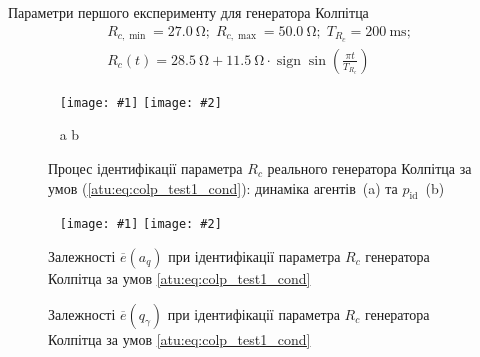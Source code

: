 \documentclass[14pt,handout,utf8]{beamer}
\DeclareMathOperator*{\sign}{sign}
\newlength\DDP
\newcommand{\ABlbl}{%
  \vspace{-2.7ex}
  \begin{center}
    ~ \hfill a \hfill\hfill b \hfill ~
  \end{center}
  \vspace{-2.0ex}
}
\newcommand{\PicDouble}[2]{%
 \begin{center}
    ~ \hfill
    \texttt{[image: \#1]}
    \hfill
    \texttt{[image: \#2]}
    \hfill ~
  \end{center}
  \ABlbl
}
\newcommand{\PicDoubleNL}[2]{%
 \begin{center}
    ~ \hfill
    \texttt{[image: \#1]}
    \hfill
    \texttt{[image: \#2]}
    \hfill ~
  \end{center}
}
\begin{document}
\begin{frame}
  \frametitle{~}

  Параметри першого експерименту для генератора Колпітца
  \begin{equation}
    \begin{array}{c}
      R_{c,\min} = \SI{27.0}{\ohm};
      \;
      R_{c,\max} = \SI{50.0}{\ohm};
      \;
      T_{R_c} = \SI{200}{\milli\second};
      \\
      R_c(t) = \SI{28.5}{\ohm} + \SI{11.5}{\ohm} \cdot \sign \sin \left(  \frac{\pi t}{T_{R_c}}  \right)
    \end{array}
    \label{atu:eq:colp_test1_cond}
  \end{equation}

  \begin{figure}[htb!]
    \PicDouble{../p6/p/r/colp_real_id-p_t_pi_ql3rlWvnAAW_real_d_0.png}{../p6/p/r/colp_real_id-p_t_p_ql3rlWvnAAW_real_d_0.png}
    \caption{Процес ідентифікації параметра $R_c$ реального генератора Колпітца за умов (\ref{atu:eq:colp_test1_cond}): динаміка агентів~(a) та $p_\mathrm{id}$~(b)}
    \label{atu:f:colp_r_id_1}
  \end{figure}

  \begin{figure}[htb!]
    \PicDoubleNL{../p6/p/r/colp_real_id-p_a_q_d_0.png}{../p6/p/r/colp_real_id-p_q_gamma_d_0.png}
    \parbox[t]{\DDP} {
      \caption{Залежності $\overline{e} (a_q) $ при ідентифікації параметра $ R_c $ генератора Колпітца за умов \ref{atu:eq:colp_test1_cond}}
      \label{atu:f:colp_real_id_p_a_q_d_0}
    }
    \hfill
    \parbox[t]{\DDP} {
      \caption{Залежності $ \overline{e} (q_\gamma) $ при ідентифікації параметра $ R_c $ генератора Колпітца за умов \ref{atu:eq:colp_test1_cond}}
      \label{atu:f:colp_real_id_p_q_gamma_d_0}
    }
  \end{figure}


\end{frame}


\end{document}
